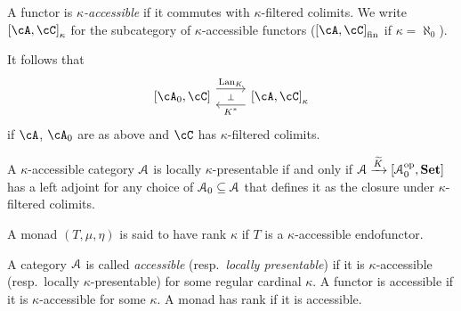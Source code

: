 \documentclass[a4paper,11pt,oneside,openany]{scrbook}
\begin{document}
\begin{defn}
	A functor is \emph{$\kappa$-accessible} if it commutes with
    $\kappa$-filtered colimits. We write $\left[\cA,\cC\right]_\kappa$ for the
    subcategory of $\kappa$-accessible functors
    ($\left[\cA,\cC\right]_{\text{fin}}$ if $\kappa=\aleph_0$).
\end{defn}
It follows that
\[
	\begin{tikzcd}
		\left[\cA_0,\cC\right]\ar[r, shift left=1.5ex,"\Lan_K",""{name=A,
        below}]
        & \left[\cA,\cC\right]_\kappa\ar[l, shift left=1.5ex,
        "K^*",""{name=B,above}] \ar[from=A, to=B, "\perp"description]
	\end{tikzcd}
\]
if $\cA$, $\cA_0$ are as above and $\cC$ has $\kappa$-filtered colimits.
\begin{rmk}
	A $\kappa$-accessible category $\operatorname{\mathcal{A}}$ is locally $\kappa$-presentable if and
    only if $\operatorname{\mathcal{A}}\xrightarrow{\widetilde{K}}\left[\operatorname{\mathcal{A}}_0^{\operatorname{\text{op}}},{\normalfont\textbf{Set}}\right]$ has a
    left adjoint for any choice of $\operatorname{\mathcal{A}}_0\subseteq\operatorname{\mathcal{A}}$ that defines it as the
    closure under $\kappa$-filtered colimits.
\end{rmk}
\begin{defn}
	A monad $(T,\mu,\eta)$ is said to have rank $\kappa$ if $T$ is a $\kappa$-accessible endofunctor.
\end{defn}
\begin{defn}
	A category $\operatorname{\mathcal{A}}$ is called \emph{accessible} (resp.\ \emph{locally presentable}) if it is $\kappa$-accessible (resp.\ locally $\kappa$-presentable) for some regular cardinal $\kappa$. A functor is accessible if it is $\kappa$-accessible for some $\kappa$. A monad has rank if it is accessible.
\end{defn}
\end{document}
